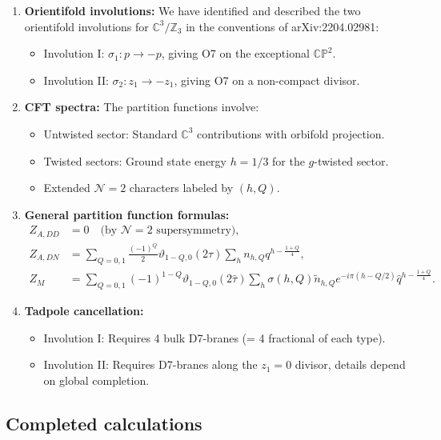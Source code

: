 \documentclass[11pt]{article}
\newcommand{\Z}{\mathbb{Z}}
\newcommand{\C}{\mathbb{C}}
\newcommand{\CP}{\mathbb{CP}}
\newcommand{\vt}{\vartheta}
\newcommand{\hq}{\hat{q}}
\newcommand{\htau}{\hat{\tau}}
\newcommand{\NN}{\mathcal{N}}
\begin{document}
\begin{enumerate}
\item \textbf{Orientifold involutions:} We have identified and described the two orientifold involutions for $\C^3/\Z_3$ in the conventions of arXiv:2204.02981:
\begin{itemize}
\item Involution I: $\sigma_1: p \to -p$, giving O7 on the exceptional $\CP^2$.
\item Involution II: $\sigma_2: z_1 \to -z_1$, giving O7 on a non-compact divisor.
\end{itemize}

\item \textbf{CFT spectra:} The partition functions involve:
\begin{itemize}
\item Untwisted sector: Standard $\C^3$ contributions with orbifold projection.
\item Twisted sectors: Ground state energy $h = 1/3$ for the $g$-twisted sector.
\item Extended $\NN=2$ characters labeled by $(h, Q)$.
\end{itemize}

\item \textbf{General partition function formulas:}
\begin{align}
Z_{A,DD} &= 0 \quad \text{(by $\NN=2$ supersymmetry)}, \\
Z_{A,DN} &= \sum_{Q=0,1} \frac{(-1)^Q}{2} \vt_{1-Q,0}(2\tau) \sum_h n_{h,Q} q^{h - \frac{1+Q}{4}}, \\
Z_M &= \sum_{Q=0,1} (-1)^{1-Q} \vt_{1-Q,0}(2\htau) \sum_h \sigma(h,Q) \tilde{n}_{h,Q} e^{-i\pi(h-Q/2)} \hq^{h - \frac{1+Q}{4}}.
\end{align}

\item \textbf{Tadpole cancellation:}
\begin{itemize}
\item Involution I: Requires 4 bulk D7-branes (= 4 fractional of each type).
\item Involution II: Requires D7-branes along the $z_1 = 0$ divisor, details depend on global completion.
\end{itemize}
\end{enumerate}

\subsection{Completed calculations}
\end{document}
